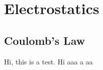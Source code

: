 \documentclass[../main.tex]{subfiles}
\begin{document}
\setcounter{chapter}{11}
\chapter{Electrostatics}

\section{Coulomb's Law}

Hi, this is a test. Hi aaa a aa
\end{document}
